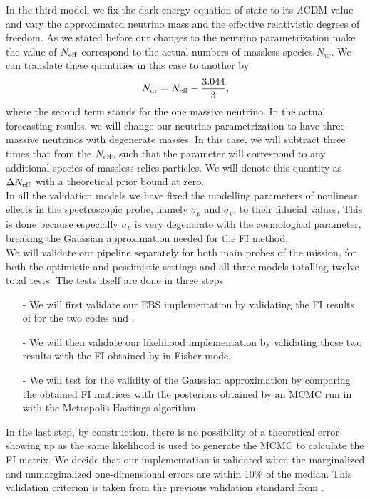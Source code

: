 \documentclass[../main.tex]{subfiles}
\begin{document}
In the third model, we fix the dark energy equation of state to its $\Lambda$CDM value and vary the approximated neutrino mass and the effective relativistic degrees of freedom. As we stated before our changes to the neutrino parametrization make the value of $N_\mathrm{eff}$ correspond to the actual numbers of massless species $N_\mathrm{ur}$. We can translate these quantities in this case to another by \begin{equation}
    N_\mathrm{ur} = N_\mathrm{eff} - \frac{3.044}{3},
\end{equation}
where the second term stands for the one massive neutrino. In the actual forecasting results, we will change our neutrino parametrization to have three massive neutrinos with degenerate masses. In this case, we will subtract three times that from the $N_\mathrm{eff}$, such that the parameter will correspond to any additional species of massless relics particles. We will denote this quantity as $\Delta N_\mathrm{eff}$ with a theoretical prior bound at zero.\\
In all the validation models we have fixed the modelling parameters of nonlinear effects in the spectroscopic probe, namely $\sigma_p$ and $\sigma_v$, to their fiducial values. This is done because especially $\sigma_p$ is very degenerate with the cosmological parameter, breaking the Gaussian approximation needed for the FI method.\\
We will validate our pipeline separately for both main probes of the \Euclid mission, for both the optimistic and pessimistic settings and all three models totalling twelve total tests. The tests itself are done in three steps \begin{itemize}
    \item[-] We will first validate our EBS implementation by validating the FI results of \cosmicfish for the two codes \camb and \class.
    \item[-] We will then validate our likelihood implementation by validating those two results with the FI obtained by \montepython in Fisher mode.
    \item[-] We will test for the validity of the Gaussian approximation by comparing the obtained FI matrices with the posteriors obtained by an MCMC run in \montepython with the Metropolis-Hastings algorithm.    
\end{itemize}
In the last step, by construction, there is no possibility of a theoretical error showing up as the same likelihood is used to generate the MCMC to calculate the FI matrix. We decide that our implementation is validated when the marginalized and unmarginalized one-dimensional errors are within 10\% of the median. This validation criterion is taken from the previous \Euclid validation standard from \cite{casas2023euclid}.\\
\end{document}

